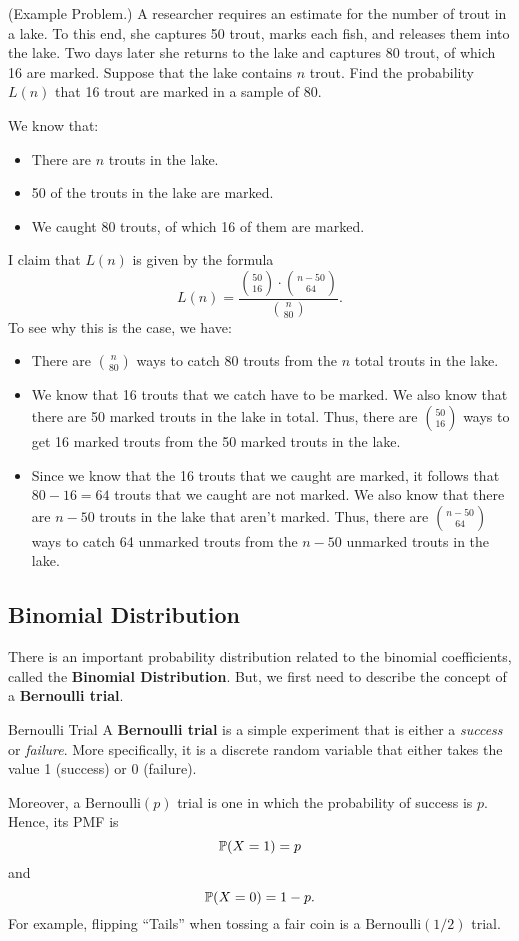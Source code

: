\begin{mdframed}[]
    (Example Problem.) A researcher requires an estimate for the number of trout in a lake. To this end, she captures 50 trout, marks each fish, and releases them into the lake. Two days later she returns to the lake and captures 80 trout, of which 16 are marked. Suppose that the lake contains $n$ trout. Find the probability $L(n)$ that 16 trout are marked in a sample of 80.

    \begin{mdframed}[]
        We know that: 
        \begin{itemize}
            \item There are $n$ trouts in the lake. 
            \item 50 of the trouts in the lake are marked. 
            \item We caught 80 trouts, of which 16 of them are marked.
        \end{itemize}
        I claim that $L(n)$ is given by the formula 
        \[L(n) = \frac{\binom{50}{16} \cdot \binom{n - 50}{64}}{\binom{n}{80}}.\]
        To see why this is the case, we have: 
        \begin{itemize}
            \item There are $\binom{n}{80}$ ways to catch 80 trouts from the $n$ total trouts in the lake. 
            \item We know that 16 trouts that we catch have to be marked. We also know that there are 50 marked trouts in the lake in total. Thus, there are $\binom{50}{16}$ ways to get 16 marked trouts from the 50 marked trouts in the lake. 
            \item Since we know that the 16 trouts that we caught are marked, it follows that $80 - 16 = 64$ trouts that we caught are not marked. We also know that there are $n - 50$ trouts in the lake that aren't marked. Thus, there are $\binom{n - 50}{64}$ ways to catch 64 unmarked trouts from the $n - 50$ unmarked trouts in the lake.
        \end{itemize}
    \end{mdframed}
\end{mdframed}


\subsection{Binomial Distribution}
There is an important probability distribution related to the binomial coefficients, called the \textbf{Binomial Distribution}. But, we first need to describe the concept of a \textbf{Bernoulli trial}.
\begin{definition}{Bernoulli Trial}{}
    A \textbf{Bernoulli trial} is a simple experiment that is either a \emph{success} or \emph{failure}. More specifically, it is a discrete random variable that either takes the value 1 (success) or 0 (failure).
\end{definition}
Moreover, a $\text{Bernoulli}(p)$ trial is one in which the probability of success is $p$. Hence, its PMF is 
\[\mathbb{P}(X = 1) = p\]
and 
\[\mathbb{P}(X = 0) = 1 - p.\]
For example, flipping ``Tails'' when tossing a fair coin is a $\text{Bernoulli}(1 / 2)$ trial. 

